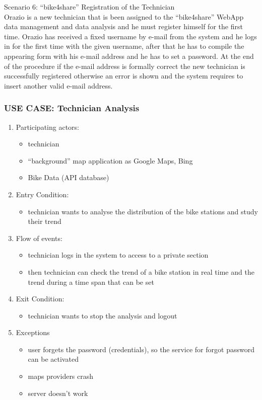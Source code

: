 \documentclass{article}
\begin{document}
Scenario 6:  “bike4share” Registration of the Technician \\
Orazio is a new technician that is been assigned to the “bike4share” WebApp data management and data analysis and he must register himself for the first time. 
Orazio has received a fixed username by e-mail from the system and he logs in for the first time with the given username, after that he has to compile the appearing form with his e-mail address and he has to set a password.
At the end of the procedure if the e-mail address is formally correct the new technician is successfully registered otherwise an error is shown and the system requires to insert another valid e-mail address. 


\subsubsection{\textbf{USE CASE}: Technician Analysis}
\begin{enumerate}
\item Participating actors: 
\begin{itemize}
    \item technician
    \item “background” map application as Google Maps, Bing
    \item Bike Data (API database)
\end{itemize}
\item Entry Condition: 
\begin{itemize}
    \item technician wants to analyse the distribution of the bike stations and study their trend
\end{itemize}
\item Flow of events: 
\begin{itemize}
    \item technician logs in the system to access to a private section
    \item then technician can check the trend of a bike station in real time and the trend during a time span that can be set
\end{itemize}
\item Exit Condition: 
\begin{itemize}
    \item technician wants to stop the analysis and logout
\end{itemize}
\item Exceptions
\begin{itemize}
    \item user forgets the password (credentials), so the service for forgot password can be activated
    \item maps providers crash
    \item server doesn’t work
\end{itemize}
\end{enumerate}
\end{document}
